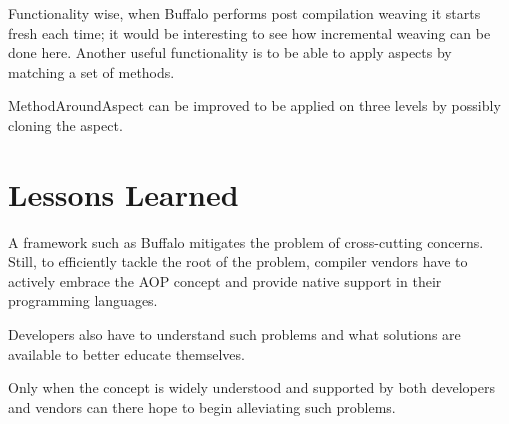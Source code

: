 Functionality wise, when Buffalo performs post compilation weaving it starts fresh each time; it would be interesting to see how incremental weaving can be done here. Another useful functionality is to be able to apply aspects by matching a set of methods.

MethodAroundAspect can be improved to be applied on three levels by possibly cloning the aspect.
\section{Lessons Learned}

A framework such as Buffalo mitigates the problem of cross-cutting concerns. Still, to efficiently tackle the root of the problem, compiler vendors have to actively embrace the AOP concept and provide native support in their programming languages.

Developers also have to understand such problems and what solutions are available to better educate themselves.

Only when the concept is widely understood and supported by both developers and vendors can there hope to begin alleviating such problems.
